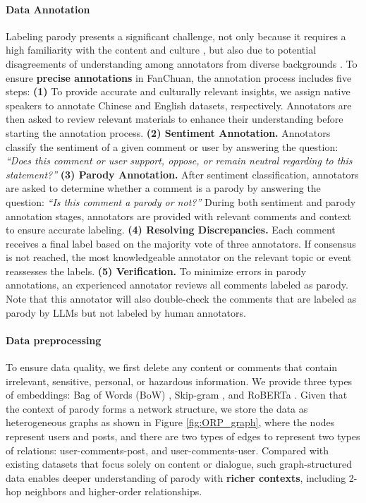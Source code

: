 \paragraph{Data Annotation} Labeling parody presents a significant challenge, not only because it requires a high familiarity with the content and culture \citep{banziger2005role}, but also due to potential disagreements of understanding among annotators from diverse backgrounds \citep{dress2008regional}. To ensure \textbf{precise annotations} in FanChuan, the annotation process includes five steps: 
\textbf{(1)} To provide accurate and culturally relevant insights, we assign native speakers to annotate Chinese and English datasets, respectively. Annotators are then asked to review relevant materials to enhance their understanding before starting the annotation process.
\textbf{(2) Sentiment Annotation.} Annotators classify the sentiment of a given comment or user by answering the question: \textit{``Does this comment or user support, oppose, or remain neutral regarding to this statement?''}
\textbf{(3) Parody Annotation.} After sentiment classification, annotators are asked to determine whether a comment is a parody by answering the question: \textit{``Is this comment a parody or not?''} During both sentiment and parody annotation stages, annotators are provided with relevant comments and context to ensure accurate labeling.
\textbf{(4) Resolving Discrepancies.} Each comment receives a final label based on the majority vote of three annotators. If consensus is not reached, the most knowledgeable annotator on the relevant topic or event reassesses the labels.
\textbf{(5) Verification.} To minimize errors in parody annotations, an experienced annotator reviews all comments labeled as parody. Note that this annotator will also double-check the comments that are labeled as parody by LLMs but not labeled by human annotators. 

\paragraph{Data preprocessing} To ensure data quality, we first delete any content or comments that contain irrelevant, sensitive, personal, or hazardous information. We provide three types of embeddings: Bag of Words (BoW) \citep{BoW}, Skip-gram \citep{Skip-gram}, and RoBERTa \citep{RoBERTa}. Given that the context of parody forms a network structure, we store the data as heterogeneous graphs as shown in Figure \ref{fig:ORP_graph}, where the nodes represent users and posts, and there are two types of edges to represent two types of relations: user-comments-post, and user-comments-user. Compared with existing datasets \citep{dialogue_bamman, ptaek2014sarcasm} that focus solely on content or dialogue, such graph-structured data enables deeper understanding of parody with \textbf{richer contexts}, including 2-hop neighbors and higher-order relationships.

